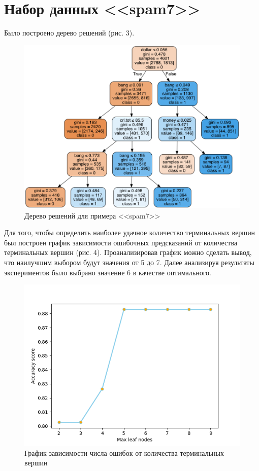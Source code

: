 \documentclass[]{article}
\numberwithin{equation}{section}
\begin{document}
    \section{Набор данных <<spam7>>}

        Было построено дерево решений (рис. 3).

        \begin{figure}[H]
            \centering
            \includegraphics[width = 0.75\linewidth]{data/spam7.png}
            \caption{Дерево решений для примера <<spam7>>}
        \end{figure}
        \vspace{-0.5cm}
        Для того, чтобы определить наиболее удачное количество терминальных вершин был построен график зависимости ошибочных предсказаний от количества терминальных вершин (рис. 4). Проанализировав график можно сделать вывод, что наилучшим выбором будут значения от 5 до 7. Далее анализируя результаты экспериментов было выбрано значение 6 в качестве оптимального.
        \vspace{-0.5cm}
        \begin{figure}[H]
            \centering
            \includegraphics[width = 0.7\linewidth]{data/spam7_stat.png}
            \caption{График зависимости числа ошибок от количества терминальных вершин}
        \end{figure}
\end{document}
